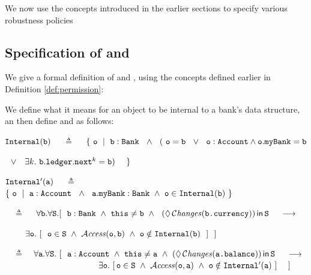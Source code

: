  We now use the concepts introduced in the earlier sections to specify various robustness policies

 \subsection{Specification of   and   }

We    give a formal definition of  and  , using the concepts defined earlier in  Definition \ref{def:permission}: %

\begin{definition}
\label{def:pol2}
We define  what it means for an object  to be internal to a bank's data structure, an then define   and     as follows:

${\mbox{\tt{Internal}}}({\mbox{\tt{b}}})$ \ \  $\triangleq$ \ \
$\{\ \prg{o}\ \mid\  \prg{b}:\prg{Bank}\ \ \wedge \ \ (\ \prg{o} = \prg{b}\ \ \vee\  \ \prg{o}:\prg{Account}\wedge \prg{o}.\prg{myBank}=\prg{b}$\\
\strut \hspace{7.3cm} $\ \ \vee\ \ \ \exists k. \ \prg{b}.\prg{ledger}.\prg{next}^k = \prg{b})\ \ \ \ \}$


${\mbox{\tt{Internal}}}'({\mbox{\tt{a}}})$ \ \  $\triangleq$ \ \
$\{\ \prg{o}\ \mid\  \prg{a}:\prg{Account}\ \ \wedge \ \
 \prg{a}.\prg{myBank} :\prg{Bank}\ \wedge\  \prg{o}\in \prg{Internal}(\prg{b})\ \}$


 \vspace{.2cm}

  \ \  $\triangleq$ \ \
  $\forall \prg{b}.\forall \prg{S}.
  [ \ \  \prg{b}:
  \prg{Bank}\ \wedge\ \prg{this}\neq\prg{b}\ \wedge\ \ \Using{(\Future\Changes{\prg{b.currency}})}{\prg{S}} \ \ \ \ \longrightarrow \ \  $\\
   \strut $~ $ \ \ \ \hspace{1.7in}  \hfill
 $\exists \prg{o}. \ [ \ \
  \prg{o}\in \prg{S}\   \wedge\  \CanAccess{\prg{o}}{\prg{b}}\ \wedge\     \prg{o}\notin\prg{Internal}(\prg{b})  \ \ ]\ \ ]$


 \vspace{.1cm}
    \Pol 4\ \  $\triangleq$\ \ $\forall \prg{a}.\forall \prg{S}.\ [ \ \  \prg{a}:\prg{Account}\   \wedge\   \prg{this}\neq\prg{a} \ \wedge\ \Using{(\Future\Changes{\prg{a.balance}})}{\prg{S}}\ \ \   \
    \longrightarrow$ \\
 $\strut \hspace{3.9cm} \hfill \exists \prg{o}.\ [\, \prg{o}\in \prg{S}\ \wedge \ \CanAccess{\prg{o}}{\prg{a}}\ \wedge  \ \prg{o} \notin\prg{Internal}'(\prg{a}) \ ] \ \ \ \ ]$

\end{definition}

